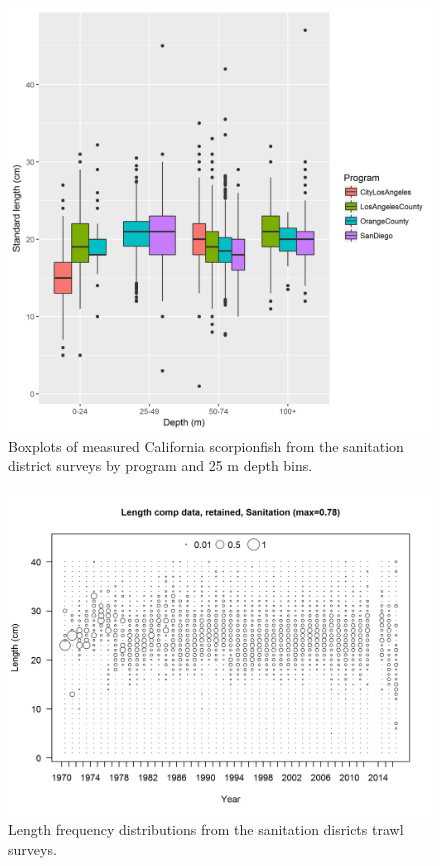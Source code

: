 \documentclass[12pt,]{article}
\begin{document}
\begin{figure}[htbp]
\centering
\includegraphics{Figures/Fleet7_Sanitation_lengthboxplots.png}
\caption{Boxplots of measured California scorpionfish from the
sanitation district surveys by program and 25 m depth bins.
\label{fig:Fleet7_Sanitation_lengthboxplots}}
\end{figure}

\FloatBarrier

\begin{figure}[htbp]
\centering
\includegraphics{r4ss/plots_mod1/comp_lendat_bubflt7mkt2_page2.png}
\caption{Length frequency distributions from the sanitation disricts
trawl surveys. \label{fig:Fleet7_comp_lendat_bubflt10mkt2}}
\end{figure}
\end{document}

